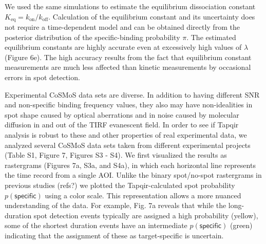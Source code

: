We used the same simulations to estimate the equilibrium dissociation constant $K_\mathrm{eq} = k_\mathrm{on}/k_\mathrm{off}$.  Calculation of the equilibrium constant and its uncertainty does not require a time-dependent model and can be obtained directly from the posterior distribution of the specific-binding probability $\pi$. The estimated equilibrium constants are highly accurate even at excessively  high values of $\lambda$ (Figure 6e).  The high accuracy results from the fact that equilibrium constant measurements are much less affected than kinetic measurements by occasional errors in spot detection. 

Experimental CoSMoS data sets are diverse.  In addition to having different SNR and non-specific binding frequency values, they also may have non-idealities in spot shape caused by optical aberrations and in noise caused by molecular diffusion in and out of the TIRF evanescent field.  In order to see if Tapqir analysis is robust to these and other properties of real experimental data, we  analyzed several CoSMoS data sets taken from different experimental projects (Table S1, Figure 7, Figures S3 - S4). We first visualized the results as rastergrams (Figures 7a, S3a, and S4a), in which each horizontal line represents the time record from a single AOI.  Unlike the binary spot/no-spot rastergrams in previous studies (refs?) we plotted the Tapqir-calculated spot probability $p(\mathsf{specific})$ using a color scale.  This representation allows a more nuanced understanding of the data.  For example, Fig. 7a reveals that while the long-duration spot detection events typically are assigned a high probability (yellow), some of the shortest duration events have an intermediate $p(\mathsf{specific})$ (green) indicating that the assignment of these as target-specific is uncertain.  

